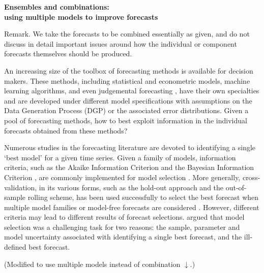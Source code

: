 \documentclass[11pt]{article}
\begin{document}
\def\spacingset#1{\renewcommand{\baselinestretch}%
{#1}\small\normalsize} \spacingset{1}

\begin{center}
{\bf\Large Ensembles and combinations: \\using multiple models to improve forecasts}
\end{center}


\bigskip


\spacingset{1.5}

Remark. We take the forecasts to be combined essentially as given, and do not discuss in detail important issues around how the individual or component forecasts themselves should be produced.

An increasing size of the toolbox of forecasting methods is available for decision makers. These methods, including statistical and econometric models, machine learning algorithms, and even judgemental forecasting \citep[see an encyclopedic overview by][]{Petropoulos2020-ft}, have their own specialties and are developed under different model specifications with assumptions on the Data Generation Process (DGP) or the associated error distributions. Given a pool of forecasting methods, how to best exploit information in the individual forecasts obtained from these methods?

Numerous studies in the forecasting literature are devoted to identifying a single `best model' for a given time series. Given a family of models, information criteria, such as the Akaike Information Criterion \citep[AIC,][]{Akaike1974-ya} and the Bayesian Information Criterion \citep[BIC,][]{Schwarz1978-cz}, are commonly implemented for model selection \citep[e.g.,][]{qi2001investigation,billah2005empirical,yang2005can}. More generally, cross-validation, in its various forms, such as the hold-out approach and the out-of-sample rolling scheme, has been used successfully to select the best forecast when multiple model families or model-free forecasts are considered \citep[e.g.,][]{Kohavi1995-zv,poler2011forecasting,fildes2015simple,inoue2017rolling,talagala2018meta}. However, different criteria may lead to different results of forecast selections. \cite{Kourentzes2019-na} argued that model selection was a challenging task for two reasons: the sample, parameter and model uncertainty associated with identifying a single best forecast, and the ill-defined best forecast.

{\color{red} (Modified to use multiple models instead of combination $\downarrow$.)}
\end{document}
